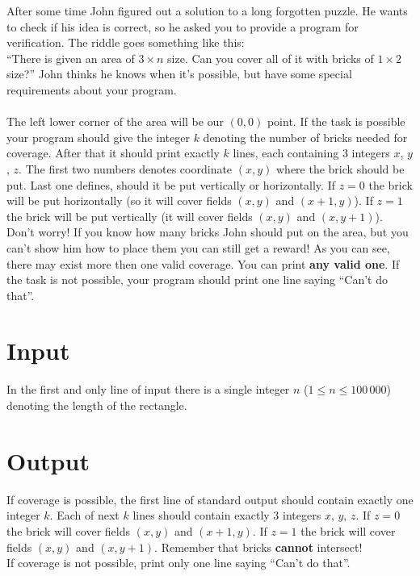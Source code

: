 \documentclass{spiral}
\begin{document}
  \makeheader

  \noindent
  After some time John figured out a solution to a long forgotten puzzle.
  He wants to check if his idea is correct, so he asked you to provide a program for verification.
  The riddle goes something like this:\\
  ``There is given an area of $3 \times n$ size. Can you cover all of it with bricks of $1 \times 2$ size?''
  John thinks he knows when it's possible, but have some special requirements about your program.\\ \\
  The left lower corner of the area will be our $(0, 0)$ point.
  If the task is possible your program should give the integer $k$
  denoting the number of bricks needed for coverage.
  After that it should print exactly $k$ lines, each containing 3 integers $x$, $y$, $z$.
  The first two numbers denotes coordinate $(x, y)$ where the brick should be put.
  Last one defines, should it be put vertically or horizontally.
  If $z = 0$ the brick will be put horizontally (so it will cover fields $(x, y)$ and $(x + 1, y)$).
  If $z = 1$ the brick will be put vertically (it will cover fields $(x, y)$ and $(x, y + 1)$).
  Don't worry! If you know how many bricks John should put on the area,
  but you can't show him how to place them you can still get a reward!
  As you can see, there may exist more then one valid coverage. You can print \textbf{any valid one}.
  If the task is not possible, your program should print one line saying ``Can't do that''.


  \section{Input}

    In the first and only line of input there is
    a single integer $n$ ($1 \leq n \leq 100\,000$) denoting the length of the rectangle.

  \section{Output}

    If coverage is possible, the first line of standard output should contain exactly one integer $k$.
    Each of next $k$ lines should contain exactly 3 integers $x$, $y$, $z$.
    If $z = 0$ the brick will cover fields $(x, y)$ and $(x + 1, y)$.
    If $z = 1$ the brick will cover fields $(x, y)$ and $(x, y + 1)$.
    Remember that bricks \textbf{cannot} intersect!\\
    If coverage is not possible, print only one line saying ``Can't do that''.
    

\end{document}
